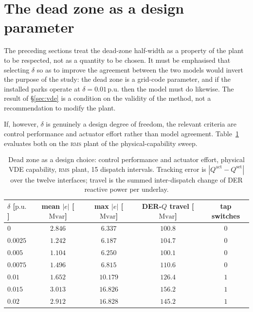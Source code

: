 \documentclass[11pt,a4paper]{article}
\newcommand{\pu}{\ensuremath{\mathrm{p.u.}}}
\newcommand{\Mvar}{\ensuremath{\mathrm{Mvar}}}
\newcommand{\rms}{\textsc{rms}}
\begin{document}
\section{The dead zone as a design parameter}
\label{sec:design}

The preceding sections treat the dead-zone half-width as a property of the
plant to be respected, not as a quantity to be chosen. It must be
emphasised that selecting $\delta$ so as to improve the agreement between
the two models would invert the purpose of the study: the dead zone is a
grid-code parameter, and if the installed parks operate at
$\delta = 0.01\,\pu$ then the model must do likewise. The result of
\S\ref{sec:vde} is a condition on the validity of the method, not a
recommendation to modify the plant.

If, however, $\delta$ is genuinely a design degree of freedom, the relevant
criteria are control performance and actuator effort rather than model
agreement. Table~\ref{tab:design} evaluates both on the \rms{} plant of the
physical-capability sweep.

\begin{table}[htbp]
  \centering
  \caption{Dead zone as a design choice: control performance and actuator
  effort, physical VDE capability, \rms{} plant, 15 dispatch intervals.
  Tracking error is $|Q^{\mathrm{act}} - Q^{\mathrm{set}}|$ over the twelve
  interfaces; travel is the summed inter-dispatch change of DER reactive
  power per underlay.}
  \label{tab:design}
  \begin{tabular}{lcccc}
    \toprule
    $\delta$ [\pu] & mean $|e|$ [\Mvar] & max $|e|$ [\Mvar]
                   & DER-$Q$ travel [\Mvar] & tap switches \\
    \midrule
    $0$        & $2.846$ & $6.337$  & $100.8$ & $0$ \\
    $0.0025$   & $1.242$ & $6.187$  & $104.7$ & $0$ \\
    $0.005$    & $\mathbf{1.104}$ & $6.250$ & $\mathbf{100.1}$ & $0$ \\
    $0.0075$   & $1.496$ & $6.815$  & $110.6$ & $0$ \\
    $0.01$     & $1.652$ & $10.179$ & $126.4$ & $1$ \\
    $0.015$    & $3.013$ & $16.826$ & $156.2$ & $1$ \\
    $0.02$     & $2.912$ & $16.828$ & $145.2$ & $1$ \\
    \bottomrule
  \end{tabular}
\end{table}
\end{document}
